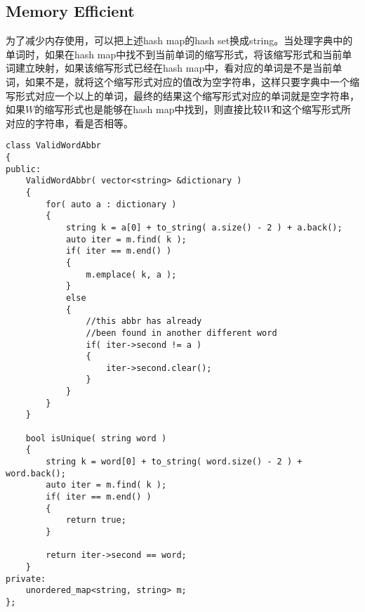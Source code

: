 \subsection{Memory Efficient}
为了减少内存使用，可以把上述hash map的hash set换成string。当处理字典中的单词时，如果在hash map中找不到当前单词的缩写形式，将该缩写形式和当前单词建立映射，如果该缩写形式已经在hash map中，看对应的单词是不是当前单词，如果不是，就将这个缩写形式对应的值改为空字符串，这样只要字典中一个缩写形式对应一个以上的单词，最终的结果这个缩写形式对应的单词就是空字符串，如果$W$的缩写形式也是能够在hash map中找到，则直接比较$W$和这个缩写形式所对应的字符串，看是否相等。
\begin{lstlisting}[style=customc, caption={Memory Efficient}]
class ValidWordAbbr
{
public:
    ValidWordAbbr( vector<string> &dictionary )
    {
        for( auto a : dictionary )
        {
            string k = a[0] + to_string( a.size() - 2 ) + a.back();
            auto iter = m.find( k );
            if( iter == m.end() )
            {
                m.emplace( k, a );
            }
            else
            {
                //this abbr has already
                //been found in another different word
                if( iter->second != a )
                {
                    iter->second.clear();
                }
            }
        }
    }

    bool isUnique( string word )
    {
        string k = word[0] + to_string( word.size() - 2 ) + word.back();
        auto iter = m.find( k );
        if( iter == m.end() )
        {
            return true;
        }

        return iter->second == word;
    }
private:
    unordered_map<string, string> m;
};
\end{lstlisting}